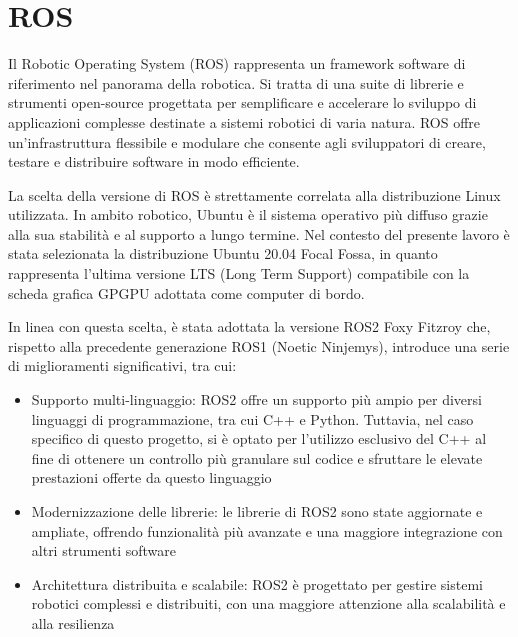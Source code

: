 \section{ROS} \label{ROS}

Il Robotic Operating System (ROS) rappresenta un framework software di riferimento nel panorama della robotica. Si tratta di una suite di librerie e strumenti open-source progettata per semplificare e accelerare lo sviluppo di applicazioni complesse destinate a sistemi robotici di varia natura. ROS offre un'infrastruttura flessibile e modulare che consente agli sviluppatori di creare, testare e distribuire software in modo efficiente.

\noindent La scelta della versione di ROS è strettamente correlata alla distribuzione Linux utilizzata. In ambito robotico, Ubuntu è il sistema operativo più diffuso grazie alla sua stabilità e al supporto a lungo termine. Nel contesto del presente lavoro è stata selezionata la distribuzione Ubuntu 20.04 Focal Fossa, in quanto rappresenta l'ultima versione LTS (Long Term Support) compatibile con la scheda grafica GPGPU adottata come computer di bordo.

\noindent In linea con questa scelta, è stata adottata la versione ROS2 Foxy Fitzroy che, rispetto alla precedente generazione ROS1 (Noetic Ninjemys), introduce una serie di miglioramenti significativi, tra cui:

\begin{itemize}
  \item Supporto multi-linguaggio: ROS2 offre un supporto più ampio per diversi linguaggi di programmazione, tra cui C++ e Python. Tuttavia, nel caso specifico di questo progetto, si è optato per l'utilizzo esclusivo del C++ al fine di ottenere un controllo più granulare sul codice e sfruttare le elevate prestazioni offerte da questo linguaggio
  \item Modernizzazione delle librerie: le librerie di ROS2 sono state aggiornate e ampliate, offrendo funzionalità più avanzate e una maggiore integrazione con altri strumenti software
  \item Architettura distribuita e scalabile: ROS2 è progettato per gestire sistemi robotici complessi e distribuiti, con una maggiore attenzione alla scalabilità e alla resilienza
\end{itemize}

